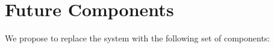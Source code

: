 \documentclass[../main-v1.tex]{subfiles}
\begin{document}













\section{Future Components}
We propose to replace the  system with %
the following set of components: 
\end{document}

